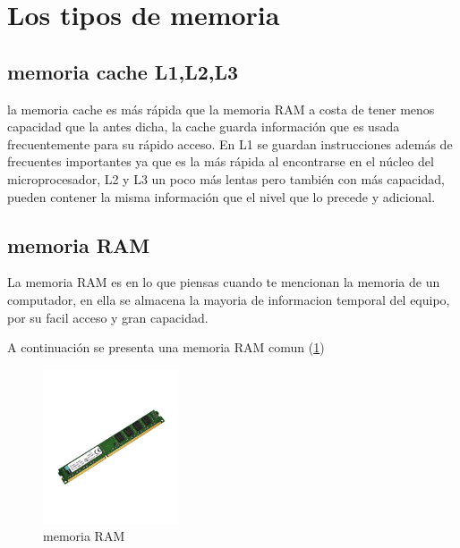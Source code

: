 \documentclass{article}
\begin{document}
 \vspace{0.4cm}

\section{Los tipos de memoria} \label{contenido}

\vspace{0.3cm}

\subsection{memoria cache L1,L2,L3}

la memoria cache es más rápida que la memoria RAM a costa de tener menos capacidad que la antes dicha, la cache guarda información que es usada frecuentemente para su rápido acceso. En L1 se guardan instrucciones además de frecuentes importantes ya que es la más rápida al encontrarse en el núcleo del microprocesador, L2 y L3 un poco más lentas pero también con más capacidad, pueden contener la misma información que el nivel que lo precede y adicional.

\vspace{0.3cm}

\subsection{memoria RAM}

La memoria RAM es en lo que piensas cuando te mencionan la memoria de un computador, en ella se almacena la mayoria de informacion temporal del equipo, por su facil acceso y gran capacidad.

\vspace{0.6cm}

A continuación se presenta una memoria RAM comun (\ref{fig:RAM})

\begin{figure}[h]
\includegraphics[width=4cm]{RAM.jpg}
\centering
\caption{memoria RAM}
\label{fig:RAM}
\end{figure}
\end{document}
